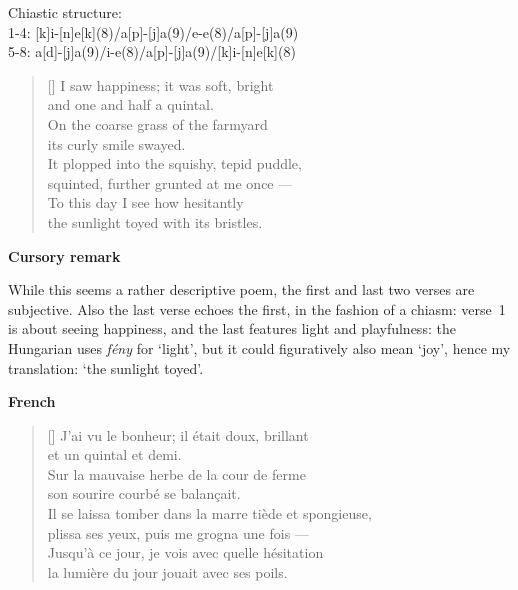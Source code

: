 \documentclass[a4paper,12pt,twoside,final]{book}
\begin{document}

\noindent Chiastic structure: \\
1-4: [k]i-[n]e[k](8)/a[p]-[j]a(9)/e-e(8)/a[p]-[j]a(9)\\
5-8: a[d]-[j]a(9)/i-e(8)/a[p]-[j]a(9)/[k]i-[n]e[k](8)

\newpage



\settowidth{\versewidth}{It plopped into the squishy, tepid puddle,}

\begin{verse}[\versewidth]
  I saw happiness; it was soft, bright \\
  and one and half a quintal. \\
  On the coarse grass of the farmyard \\
  its curly smile swayed. \\
  It plopped into the squishy, tepid puddle, \\
  squinted, further grunted at me once --- \\
  To this day I see how hesitantly \\
  the sunlight toyed with its bristles. \\
\end{verse}

\bigskip

\noindent \textbf{Cursory remark}

\medskip

While this seems a rather descriptive poem, the first and last two
verses are subjective. Also the last verse echoes the first, in the
fashion of a chiasm: verse~1 is about seeing happiness, and the last
features light and playfulness: the Hungarian uses \emph{fény} for
`light', but it could figuratively also mean `joy', hence my
translation: `the sunlight toyed'.

\bigskip

\noindent \textbf{French}


\settowidth{\versewidth}{Il se laissa tomber dans la marre tiède et spongieuse,}

\begin{verse}[\versewidth]
  J'ai vu le bonheur; il était doux, brillant \\
  et un quintal et demi. \\
  Sur la mauvaise herbe de la cour de ferme \\
  son sourire courbé se balançait. \\
  Il se laissa tomber dans la marre tiède et spongieuse, \\
  plissa ses yeux, puis me grogna une fois --- \\
  Jusqu'à ce jour, je vois avec quelle hésitation \\
  la lumière du jour jouait avec ses poils. \\
\end{verse}
\end{document}
